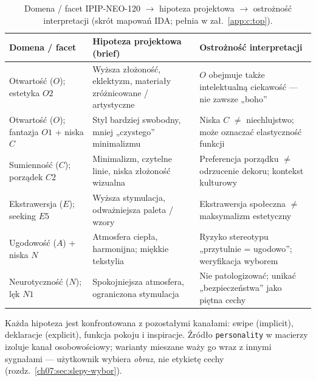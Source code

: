 \begin{table}[htbp]
  \centering
  \caption{Domena / facet IPIP-NEO-120 $\rightarrow$ hipoteza projektowa $\rightarrow$ ostrożność interpretacji
    (skrót mapowań IDA; pełnia w zał.~\ref{app:c:top}).}
  \label{tab:ch05:hipotezy}
  \begin{tabular}{@{}p{}p{}p{}@{}}
    \toprule
    Domena / facet & Hipoteza projektowa (brief) & Ostrożność interpretacji \\
    \midrule
    Otwartość ($O$); estetyka $O2$
      & Wyższa złożoność, eklektyzm, materiały zróżnicowane / artystyczne
      & $O$ obejmuje także intelektualną ciekawość --- nie zawsze „boho” \\
    \addlinespace
    Otwartość ($O$); fantazja $O1$ + niska $C$
      & Styl bardziej swobodny, mniej „czystego” minimalizmu
      & Niska $C$ $\neq$ niechlujstwo; może oznaczać elastyczność funkcji \\
    \addlinespace
    Sumienność ($C$); porządek $C2$
      & Minimalizm, czytelne linie, niska złożoność wizualna
      & Preferencja porządku $\neq$ odrzucenie dekoru; kontekst kulturowy \\
    \addlinespace
    Ekstrawersja ($E$); seeking $E5$
      & Wyższa stymulacja, odważniejsza paleta / wzory
      & Ekstrawersja społeczna $\neq$ maksymalizm estetyczny \\
    \addlinespace
    Ugodowość ($A$) + niska $N$
      & Atmosfera ciepła, harmonijna; miękkie tekstylia
      & Ryzyko stereotypu „przytulnie = ugodowo”; weryfikacja wyborem \\
    \addlinespace
    Neurotyczność ($N$); lęk $N1$
      & Spokojniejsza atmosfera, ograniczona stymulacja
      & Nie patologizować; unikać „bezpieczeństwa” jako piętna cechy \\
    \bottomrule
  \end{tabular}
\end{table}


Każda hipoteza jest konfrontowana z pozostałymi kanałami: swipe (implicit), deklaracje (explicit), funkcja pokoju i inspiracje.
Źródło \texttt{personality} w macierzy izoluje kanał osobowościowy; warianty mieszane waży go wraz z innymi sygnałami --- użytkownik wybiera \emph{obraz}, nie etykietę cechy (rozdz.~\ref{ch07:sec:slepy-wybor}).

